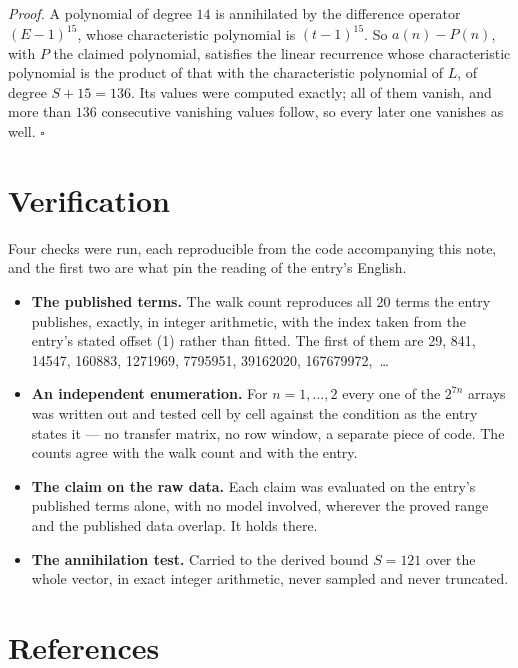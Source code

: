 \documentclass[11pt]{article}
\theoremstyle{definition}
\begin{document}
{\itshape Proof.} A polynomial of degree $14$ is annihilated by the difference operator $(E-1)^{15}$, whose characteristic polynomial is $(t-1)^{15}$. So $a(n) - P(n)$, with $P$ the claimed polynomial, satisfies the linear recurrence whose characteristic polynomial is the product of that with the characteristic polynomial of $L$, of degree $S + 15 = 136$. Its values were computed exactly; all of them vanish, and more than $136$ consecutive vanishing values follow, so every later one vanishes as well. $\square$

\section{Verification}

Four checks were run, each reproducible from the code accompanying this note, and the first two are what pin the reading of the entry's English.

\begin{itemize}

\item {\bfseries The published terms.} The walk count reproduces all 20 terms the entry publishes, exactly, in integer arithmetic, with the index taken from the entry's stated offset (1) rather than fitted. The first of them are 29, 841, 14547, 160883, 1271969, 7795951, 39162020, 167679972,~\dots

\item {\bfseries An independent enumeration.} For $n = 1,\dots,2$ every one of the $2^{7n}$ arrays was written out and tested cell by cell against the condition as the entry states it --- no transfer matrix, no row window, a separate piece of code. The counts agree with the walk count and with the entry.

\item {\bfseries The claim on the raw data.} Each claim was evaluated on the entry's published terms alone, with no model involved, wherever the proved range and the published data overlap. It holds there.

\item {\bfseries The annihilation test.} Carried to the derived bound $S = 121$ over the whole vector, in exact integer arithmetic, never sampled and never truncated.

\end{itemize}

\section{References}
\end{document}

